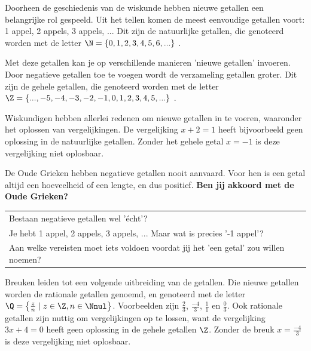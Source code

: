 \documentclass{ximera}
\begin{document}
    \author{Kwinten Obbels}

Doorheen de geschiedenis van de wiskunde hebben nieuwe getallen een belangrijke rol gespeeld.
Uit het tellen komen de meest eenvoudige getallen voort: 1 appel, 2 appels, 3 appels, ... 
Dit zijn de natuurlijke getallen, die genoteerd worden met de letter \( \N = \{0, 1, 2, 3, 4, 5, 6, ...\} \) . 

Met deze getallen kan je op verschillende manieren 'nieuwe getallen' invoeren. 
Door negatieve getallen toe te voegen wordt de verzameling getallen groter.  
Dit zijn de gehele getallen, die genoteerd worden met de letter  \( \Z = \{..., -5, -4, -3, -2, -1, 0, 1, 2, 3, 4, 5, ...\} \) . 

Wiskundigen hebben allerlei redenen om nieuwe getallen in te voeren, waaronder het oplossen van vergelijkingen. 
De vergelijking \(x + 2 = 1\) heeft bijvoorbeeld geen oplossing in de natuurlijke getallen.
Zonder het gehele getal \(x = -1\) is deze vergelijking niet oplosbaar. 


\begin{denkvraag*}{}
    De Oude Grieken hebben negatieve getallen nooit aanvaard. 
    Voor hen is een getal altijd een hoeveelheid of een lengte, en dus positief. 
    \textbf{Ben jij akkoord met de Oude Grieken?}
    \\
\begin{tabular}{@{\qquad}l}
    Bestaan negatieve getallen wel 'écht'? \\
    Je hebt 1 appel, 2 appels, 3 appels, ... Maar wat is precies '-1 appel'? \\
    Aan welke vereisten moet iets voldoen voordat jij het 'een getal' zou willen noemen? \\
\end{tabular}
\end{denkvraag*}


Breuken leiden tot een volgende uitbreiding van de getallen.
Die nieuwe getallen worden de rationale getallen genoemd, en genoteerd met de letter \( \Q  = \left\{ \frac{z}{n} \mid z \in \Z, n \in \Nnul \right\}\).
Voorbeelden zijn \(\frac{2}{3}\), \(\frac{-4}{3}\), \(\frac{1}{1}\) en \(\frac{0}{3}\). 
Ook rationale getallen zijn nuttig om vergelijkingen op te lossen, 
want de vergelijking \(3x + 4 = 0\) heeft geen oplossing in de gehele getallen \( \Z \).
Zonder de breuk \(x = \frac{-4}{3}\) is deze vergelijking niet oplosbaar.
\end{document}
